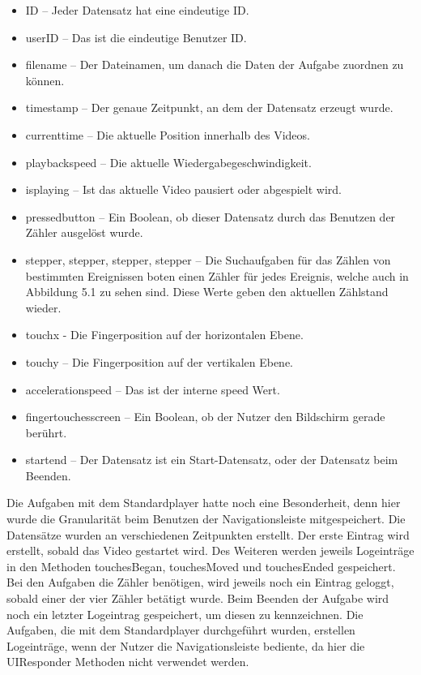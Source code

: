 \documentclass[11pt,a4paper]{report}
\begin{document}
\begin{itemize}
\item ID – Jeder Datensatz hat eine eindeutige ID.
\item userID – Das ist die eindeutige Benutzer ID.
\item filename – Der Dateinamen, um danach die Daten der Aufgabe zuordnen zu können.
\item timestamp – Der genaue Zeitpunkt, an dem der Datensatz erzeugt wurde.
\item currenttime – Die aktuelle Position innerhalb des Videos.
\item playbackspeed – Die aktuelle Wiedergabegeschwindigkeit.
\item isplaying – Ist das aktuelle Video pausiert oder abgespielt wird.
\item pressed\textunderscore button – Ein Boolean, ob dieser Datensatz durch das Benutzen der Zähler ausgelöst wurde.
\item stepper, stepper, stepper, stepper – Die Suchaufgaben für das Zählen von bestimmten Ereignissen boten einen Zähler für jedes Ereignis, welche auch in Abbildung 5.1 zu sehen sind. Diese Werte geben den aktuellen Zählstand wieder.
\item touch\textunderscore x - Die Fingerposition auf der horizontalen Ebene.
\item touch\textunderscore y – Die Fingerposition auf der vertikalen Ebene.
\item acceleration\textunderscore speed – Das ist der interne speed Wert.
\item finger\textunderscore touches\textunderscore screen – Ein Boolean, ob der Nutzer den Bildschirm gerade berührt.
\item start\textunderscore end – Der Datensatz ist ein Start-Datensatz, oder der Datensatz beim Beenden.
\end{itemize}
Die Aufgaben mit dem Standardplayer hatte noch eine Besonderheit, denn hier wurde die Granularität beim Benutzen der Navigationsleiste mitgespeichert. Die Datensätze wurden an verschiedenen Zeitpunkten erstellt. Der erste Eintrag wird erstellt, sobald das Video gestartet wird. Des Weiteren werden jeweils Logeinträge in den Methoden touchesBegan, touchesMoved und touchesEnded gespeichert. Bei den Aufgaben die Zähler benötigen, wird jeweils noch ein Eintrag geloggt, sobald einer der vier Zähler betätigt wurde. Beim Beenden der Aufgabe wird noch ein letzter Logeintrag gespeichert, um diesen zu kennzeichnen. Die Aufgaben, die mit dem Standardplayer durchgeführt wurden, erstellen Logeinträge, wenn der Nutzer die Navigationsleiste bediente, da hier die UIResponder Methoden nicht verwendet werden.
\end{document}
